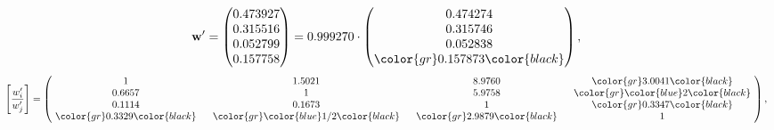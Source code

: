 \begin{example}
\begin{equation*}
\mathbf{w}^{\prime} =
\begin{pmatrix}
0.473927\\
0.315516\\
0.052799\\
0.157758
\end{pmatrix} =
0.999270\cdot
\begin{pmatrix}
0.474274\\
0.315746\\
0.052838\\
\color{gr} 0.157873\color{black}
\end{pmatrix},
\end{equation*}
\begin{equation*}
\left[ \frac{{w}^{\prime}_i}{{w}^{\prime}_j} \right] =
\begin{pmatrix}
$\,\,$ 1 $\,\,$ & $\,\,$1.5021$\,\,$ & $\,\,$8.9760$\,\,$ & $\,\,$\color{gr} 3.0041\color{black} $\,\,$ \\
$\,\,$0.6657$\,\,$ & $\,\,$ 1 $\,\,$ & $\,\,$5.9758$\,\,$ & $\,\,$\color{gr} \color{blue} 2\color{black}   $\,\,$ \\
$\,\,$0.1114$\,\,$ & $\,\,$0.1673$\,\,$ & $\,\,$ 1 $\,\,$ & $\,\,$\color{gr} 0.3347\color{black}  $\,\,$ \\
$\,\,$\color{gr} 0.3329\color{black} $\,\,$ & $\,\,$\color{gr} \color{blue}  1/2\color{black} $\,\,$ & $\,\,$\color{gr} 2.9879\color{black} $\,\,$ & $\,\,$ 1  $\,\,$ \\
\end{pmatrix},
\end{equation*}
\end{example}
\newpage
